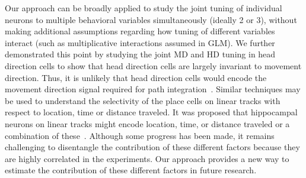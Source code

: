 \documentclass[11pt]{article}
\begin{document}






Our approach can be broadly applied to study the joint tuning of individual neurons to multiple behavioral variables simultaneously (ideally 2 or 3), without making additional assumptions regarding how tuning of different variables interact (such as multiplicative interactions assumed in GLM). We further demonstrated this point by studying the joint MD and HD tuning in head direction cells to show that head direction cells are largely invariant to movement direction. Thus, it is unlikely that head direction cells would encode the movement direction signal required for path integration~\cite{Mcnaughton2006}. 
Similar techniques may be used to understand the selectivity of the place cells on linear tracks with respect to location, time or distance traveled. It was proposed that hippocampal neurons on linear tracks might encode location, time, or distance traveled or a combination of these~\cite{Eichenbaum2014time,Chen2024}. Although some progress has been made, it remains challenging to disentangle the contribution of these different factors because they are highly correlated in the experiments. Our approach provides a new way to estimate the contribution of these different factors in future research. 
\end{document}
